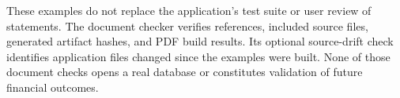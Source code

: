 These examples do not replace the application's test suite or user review of statements. The document checker verifies references, included source files, generated artifact hashes, and PDF build results. Its optional source-drift check identifies application files changed since the examples were built. None of those document checks opens a real database or constitutes validation of future financial outcomes.

